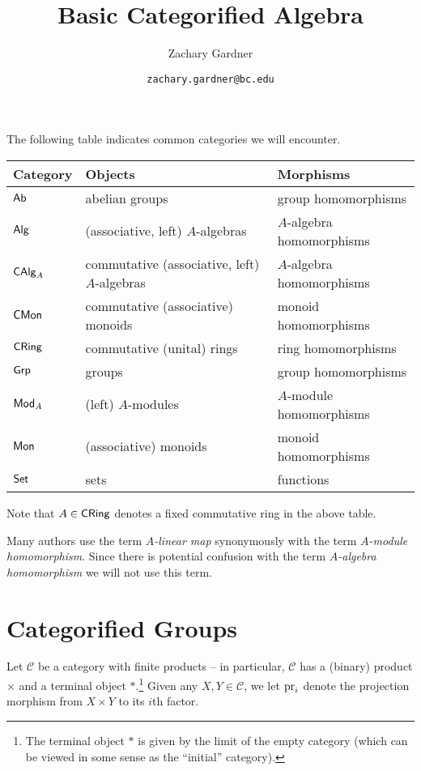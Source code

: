 \documentclass[11pt]{article}
\renewcommand{\C}{\mathcal{C}}
\begin{document}
\title{Basic Categorified Algebra}
\author{Zachary Gardner}
\date{\texttt{zachary.gardner@bc.edu}}
\maketitle

The following table indicates common categories we will encounter.
\begin{center}
\begin{tabular}{|l|l|l|}
\hline
Category & Objects & Morphisms \\
\hline
$\operatorname{\mathsf{Ab}}$ & abelian groups & group homomorphisms \\
$\operatorname{\mathsf{Alg}}$ & (associative, left) $A$-algebras & $A$-algebra homomorphisms \\
$\operatorname{\mathsf{CAlg}}_A$ & commutative (associative, left) $A$-algebras & $A$-algebra homomorphisms \\
$\operatorname{\mathsf{CMon}}$ & commutative (associative) monoids & monoid homomorphisms \\
$\operatorname{\mathsf{CRing}}$ & commutative (unital) rings & ring homomorphisms \\
$\operatorname{\mathsf{Grp}}$ & groups & group homomorphisms \\
$\operatorname{\mathsf{Mod}}_A$ & (left) $A$-modules & $A$-module homomorphisms \\
$\operatorname{\mathsf{Mon}}$ & (associative) monoids & monoid homomorphisms \\
$\operatorname{\mathsf{Set}}$ & sets & functions \\
\hline
\end{tabular}
\end{center}
Note that $A\in\operatorname{\mathsf{CRing}}$ denotes a fixed commutative ring in the above table.

\begin{remark}
Many authors use the term \emph{$A$-linear map} synonymously with the term \emph{$A$-module homomorphism}. Since there is potential confusion with the term \emph{$A$-algebra homomorphism} we will not use this term.
\end{remark}

\section{Categorified Groups}
Let $\C$ be a category with finite products -- in particular, $\C$ has a (binary) product $\times$ and a terminal object $*$.\footnote{The terminal object $*$ is given by the limit of the empty category (which can be viewed in some sense as the ``initial'' category).} Given any $X,Y\in\C$, we let $\operatorname{pr}_i$ denote the projection morphism from $X\times Y$ to its $i$th factor.
\end{document}
